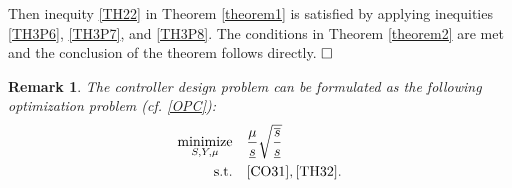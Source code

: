 \documentclass[journal,twoside,web]{ieeecolor}
\renewenvironment{proof}{\vspace{.1cm}\noindent{\sc Proof.}\hspace{0.10cm}\,\,}{$\hfill\Box$\vspace{.1cm}}
\newtheorem{remark}	      [theorem]{Remark}
\begin{document}
\begin{proof}
\begin{equation}
\begin{aligned}
\end{aligned}
\end{equation}
Then inequity \eqref{TH22} in Theorem \ref{theorem1} is satisfied by applying inequities \eqref{TH3P6}, \eqref{TH3P7}, and \eqref{TH3P8}. The conditions in Theorem \ref{theorem2} are met and the
conclusion of the theorem follows directly. 
\end{proof}
\begin{remark}\label{rem5}
The controller design problem can be formulated as the following optimization problem (cf. \eqref{OPC}):
\begin{align}
\underset{S, Y, \mu}{\text{minimize}} 
\quad & \frac{\mu}{\underline{s}}\sqrt{\frac{\overline{s}}{\underline{s}}}\nonumber\\
\text{s.t.} \quad & \eqref{CO31}, \eqref{TH32}.\label{OPC1}
\end{align}
\end{remark}
\end{document}
